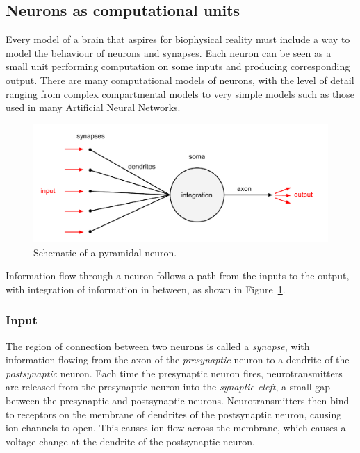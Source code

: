 \documentclass[a4paper,12pt]{report}
\theoremstyle{definition}
\begin{document}
\subsection{Neurons as computational units}
Every model of a brain that aspires for biophysical reality must include a way to model the behaviour of neurons and synapses. Each neuron can be seen as a small unit performing computation on some inputs and producing corresponding output. There are many computational models of neurons, with the level of detail ranging from complex compartmental models to very simple models such as those used in many Artificial Neural Networks. 

\begin{figure}[h]
    \includegraphics[width=\textwidth]{fig1}
    \caption{Schematic of a pyramidal neuron.}
    \label{fig:pyramidal}
\end{figure}

Information flow through a neuron follows a path from the inputs to the output, with integration of information in between, as shown in Figure~\ref{fig:pyramidal}.


\subsubsection{Input}

The region of connection between two neurons is called a \emph{synapse}, with information flowing from the axon of the \emph{presynaptic} neuron to a dendrite of the \emph{postsynaptic} neuron. Each time the presynaptic neuron fires, neurotransmitters are released from the presynaptic neuron into the \emph{synaptic cleft}, a small gap between the presynaptic and postsynaptic neurons.
Neurotransmitters then bind to receptors on the membrane of dendrites of the postsynaptic neuron, causing ion channels to open. This causes ion flow across the membrane, which causes a voltage change at the dendrite of the postsynaptic neuron.
\end{document}
